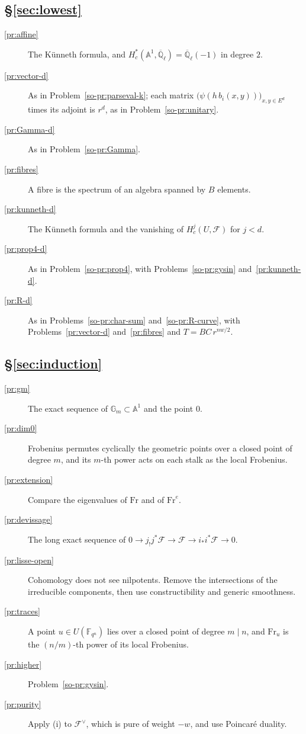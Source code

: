 \documentclass[reqno]{amsart}
\theoremstyle{definition}
\theoremstyle{plain}
\newcommand{\Q}{\mathbb{Q}}
\newcommand{\F}{\mathbb{F}}
\newcommand{\A}{\mathbb{A}}
\newcommand{\G}{\mathbb{G}}
\newcommand{\Ql}{\overline{\Q}_\ell}
\newcommand{\cF}{\mathcal{F}}
\newcommand{\Fr}{\mathrm{Fr}}
\begin{document}
\subsection*{\S\ref{sec:lowest}}
\begin{description}
\item[\ref{pr:affine}] The K\"unneth formula, and \(H^*_c(\A^1, \Ql) = \Ql(-1)\) in degree \(2\).
\item[\ref{pr:vector-d}] As in Problem~\ref{so-pr:parseval-k}; each matrix \(\bigl(\psi(h\, b_i(x,y))\bigr)_{x,y \in E^d}\) times its adjoint is \(r^d\), as in Problem~\ref{so-pr:unitary}.
\item[\ref{pr:Gamma-d}] As in Problem~\ref{so-pr:Gamma}.
\item[\ref{pr:fibres}] A fibre is the spectrum of an algebra spanned by \(B\) elements.
\item[\ref{pr:kunneth-d}] The K\"unneth formula and the vanishing of \(H^j_c(U, \cF)\) for \(j < d\).
\item[\ref{pr:prop4-d}] As in Problem~\ref{so-pr:prop4}, with Problems~\ref{so-pr:gysin} and~\ref{pr:kunneth-d}.
\item[\ref{pr:R-d}] As in Problems~\ref{so-pr:char-sum} and~\ref{so-pr:R-curve}, with Problems~\ref{pr:vector-d} and~\ref{pr:fibres} and \(T = BC\,r^{nw/2}\).
\end{description}

\subsection*{\S\ref{sec:induction}}
\begin{description}
\item[\ref{pr:gm}] The exact sequence of \(\G_m \subset \A^1\) and the point \(0\).
\item[\ref{pr:dim0}] Frobenius permutes cyclically the geometric points over a closed point of degree \(m\), and its \(m\)-th power acts on each stalk as the local Frobenius.
\item[\ref{pr:extension}] Compare the eigenvalues of \(\Fr\) and of \(\Fr^e\).
\item[\ref{pr:devissage}] The long exact sequence of \(0 \to j_!j^*\cF \to \cF \to i_*i^*\cF \to 0\).
\item[\ref{pr:lisse-open}] Cohomology does not see nilpotents.  Remove the intersections of the irreducible components, then use constructibility and generic smoothness.
\item[\ref{pr:traces}] A point \(u \in U(\F_{q^n})\) lies over a closed point of degree \(m \mid n\), and \(\Fr_u\) is the \((n/m)\)-th power of its local Frobenius.
\item[\ref{pr:higher}] Problem~\ref{so-pr:gysin}.
\item[\ref{pr:purity}] Apply (i) to \(\cF^\vee\), which is pure of weight \(-w\), and use Poincar\'e duality.
\end{description}
\end{document}
